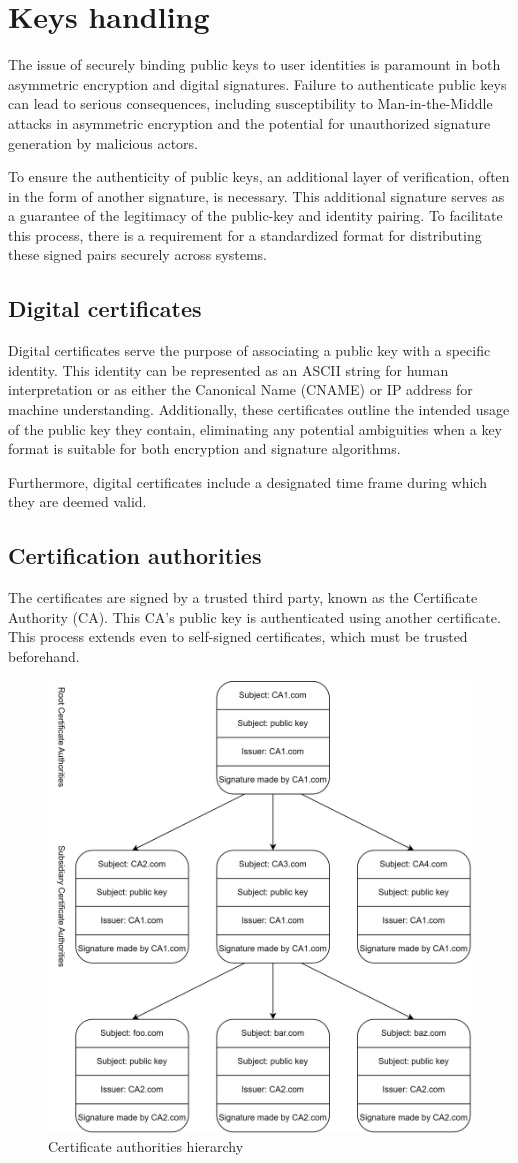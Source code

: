 \section{Keys handling}

The issue of securely binding public keys to user identities is paramount in both asymmetric encryption and digital signatures.
Failure to authenticate public keys can lead to serious consequences, including susceptibility to Man-in-the-Middle attacks in asymmetric encryption and the potential for unauthorized signature generation by malicious actors.

To ensure the authenticity of public keys, an additional layer of verification, often in the form of another signature, is necessary. 
This additional signature serves as a guarantee of the legitimacy of the public-key and identity pairing. 
To facilitate this process, there is a requirement for a standardized format for distributing these signed pairs securely across systems.

\subsection{Digital certificates}
Digital certificates serve the purpose of associating a public key with a specific identity. 
This identity can be represented as an ASCII string for human interpretation or as either the Canonical Name (CNAME) or IP address for machine understanding. 
Additionally, these certificates outline the intended usage of the public key they contain, eliminating any potential ambiguities when a key format is suitable for both encryption and signature algorithms.

Furthermore, digital certificates include a designated time frame during which they are deemed valid. 

\subsection{Certification authorities}
The certificates are signed by a trusted third party, known as the Certificate Authority (CA). 
This CA's public key is authenticated using another certificate. 
This process extends even to self-signed certificates, which must be trusted beforehand.
\begin{figure}[H]
    \centering
    \includegraphics[width=0.5\linewidth]{images/ca.png}
    \caption{Certificate authorities hierarchy}
\end{figure}